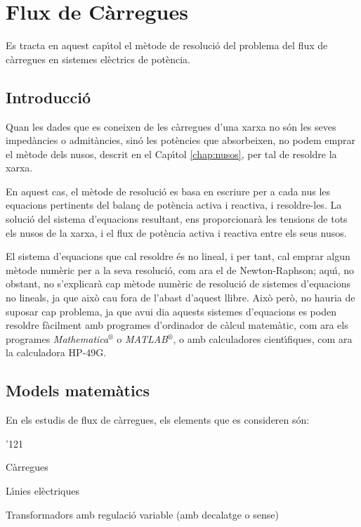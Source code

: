 \chapter{Flux de C\`{a}rregues}

Es tracta en aquest cap\'{\i}tol el m\`{e}tode de resoluci\'{o} del problema del flux de c\`{a}rregues en
sistemes el\`{e}ctrics de pot\`{e}ncia.

\section{Introducci\'{o}}

Quan les dades que es coneixen de les c\`{a}rregues d'una xarxa no s\'{o}n
les seves imped\`{a}ncies o admit\`{a}ncies, sin\'{o} les pot\`{e}ncies que
absorbeixen, no podem emprar el m\`{e}tode dels nusos, descrit en el
Cap\'{\i}tol \ref{chap:nusos}, per tal de resoldre la xarxa.

En aquest cas, el m\`{e}tode de resoluci\'{o} es basa en escriure per a cada
nus les equacions pertinents del balan\c{c} de pot\`{e}ncia activa i
reactiva, i resoldre-les. La soluci\'{o} del sistema d'equacions
resultant, ens proporcionar\`{a} les tensions de tots els nusos de la
xarxa, i el flux de pot\`{e}ncia activa i reactiva entre els seus nusos.

El sistema d'equacions que cal resoldre \'{e}s no lineal, i per tant,
cal emprar algun m\`{e}tode num\`{e}ric per a la seva resoluci\'{o}, com ara el
de Newton-Raphson; aqu\'{\i}, no obstant, no
s'explicar\`{a} cap m\`{e}tode num\`{e}ric de resoluci\'{o} de sistemes d'equacions
no lineals, ja que aix\`{o} cau fora de l'abast d'aquest llibre. Aix\`{o}
per\`{o}, no hauria de suposar cap problema, ja que avui dia aquests
sistemes d'equacions es poden resoldre f\`{a}cilment amb programes
d'ordinador de c\`{a}lcul matem\`{a}tic, com ara els programes
\textit{Mathematica}${}^\circledR$ o \textit{MATLAB}${}^\circledR$,
 o amb calculadores
cient\'{\i}fiques, com ara la calculadora \textsf{HP-49G}.

\section{Models matem\`{a}tics} 

En els estudis de flux de c\`{a}rregues, els elements que es consideren s\'{o}n:
\begin{dinglist}{'121}
   \item C\`{a}rregues
   \item L\'{\i}nies el\`{e}ctriques
   \item Transformadors amb regulaci\'{o} variable (amb decalatge o sense)
\end{dinglist}

